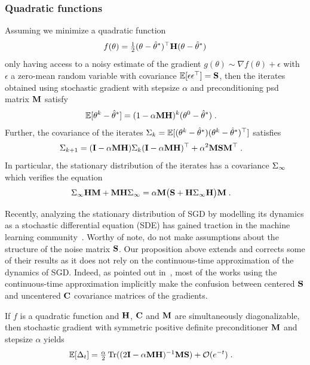 \subsubsection{Quadratic functions}
\begin{proposition}
\label{prop:quadratic}
Assuming we minimize a quadratic function $$f(\theta) = \tfrac{1}{2} (\theta - \hat\theta^\ast)^\top {\mathbf{H}} (\theta-\hat\theta^\ast)$$ only having access to a noisy estimate of the gradient $g(\theta) \sim \nabla f(\theta) + \epsilon$ with $\epsilon$ a zero-mean random variable with covariance $\mathbb{E} [\epsilon \epsilon^\top ] = {\mathbf{S}}$, then the iterates obtained using stochastic gradient with stepsize $\alpha$ and preconditioning psd matrix ${\mathbf{M}}$ satisfy
\begin{align*}
    \mathbb{E} [\theta^k - \hat\theta^\ast] &= (1 - \alpha {\mathbf{M}} {\mathbf{H}})^k (\theta^0 - \hat\theta^\ast) \; .
\end{align*}
Further, the covariance of the iterates ${\mathrm{\Sigma}}_k = {\mathbb{E} [ (\theta^k-\hat\theta^\ast) (\theta^k-\hat\theta^\ast)^\top]} $ satisfies
\begin{align*}
    {\mathrm{\Sigma}}_{k+1} &=  ({\mathbf{I}}  -\alpha {\mathbf{M}} {\mathbf{H}}) {\mathrm{\Sigma}}_{k}  ({\mathbf{I}}  -\alpha {\mathbf{M}} {\mathbf{H}})^\top + \alpha^2 {\mathbf{M}} {\mathbf{S}} {\mathbf{M}}^\top\; .
\end{align*}
In particular, the stationary distribution of the iterates has a covariance ${\mathrm{\Sigma}}_\infty$ which verifies the equation
\begin{align*}
    {\mathrm{\Sigma}}_\infty {\mathbf{H}} {\mathbf{M}} + {\mathbf{M}} {\mathbf{H}} {\mathrm{\Sigma}}_\infty &=  \alpha {\mathbf{M}} \big( {\mathbf{S}} + {\mathbf{H}} {\mathrm{\Sigma}}_\infty {\mathbf{H}}\big) {\mathbf{M}}\; .
\end{align*}
\end{proposition}
Recently, analyzing the stationary distribution of SGD by modelling its dynamics as a stochastic differential equation (SDE) has gained traction in the machine learning community~\citep{chaudhari2017stochastic, jastrzkebski2017three}. Worthy of note, \citet{mandt2017stochastic, zhu2018anisotropic} do not make assumptions about the structure of the noise matrix ${\mathbf{S}}$. Our proposition above extends and corrects some of their results as it does not rely on the continuous-time approximation of the dynamics of SGD. Indeed, as pointed out in~\citet{yaida2018fluctuation}, most of the works using the continuous-time approximation implicitly make the confusion between centered ${\mathbf{S}}$ and uncentered ${\mathbf{C}}$ covariance matrices of the gradients.

\begin{proposition}
\label{prop:sg_limit} 
If $f$ is a quadratic function and ${\mathbf{H}}$, ${\mathbf{C}}$ and ${\mathbf{M}}$ are simultaneously diagonalizable, then stochastic gradient with symmetric positive definite preconditioner ${\mathbf{M}}$ and stepsize $\alpha$ yields
\begin{align}
\mathbb{E}[\Delta_t]  &= \tfrac{\alpha}{2} \operatorname{Tr} ((2 {\mathbf{I}} - \alpha {\mathbf{M}} {\mathbf{H}})^{-1} {\mathbf{M}} {\mathbf{S}}) + {\mathcal{O}}(e^{-t}) \; .
\end{align}
\end{proposition}

